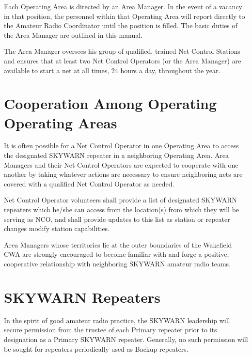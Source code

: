 \documentclass[pdflatex,letterpaper,twoside,12pt]{book}
\begin{document}
Each Operating Area is directed by an Area Manager.  In the event of a vacancy in that position, the personnel within that Operating Area will report directly to the Amateur Radio Coordinator until the position is filled.  The basic duties of the Area Manager are outlined in this manual. 

The Area Manager oversees his group of qualified, trained Net Control Stations and ensures that at least two Net Control Operators (or the Area Manager) are available to start a net at all times, 24 hours a day, throughout the year. 


\section{Cooperation Among Operating Operating Areas}

It is often possible for a Net Control Operator in one Operating Area to access the designated SKYWARN repeater in a neighboring Operating Area.  Area Managers and their Net Control Operators are expected to cooperate with one another by taking whatever actions are necessary to ensure neighboring nets are covered with a qualified Net Control Operator as needed. 

Net Control Operator volunteers shall provide a list of designated SKYWARN repeaters which he/she can access from the location(s) from which they will be serving as NCO, and shall provide updates to this list as station or repeater changes modify station capabilities. 

Area Managers whose territories lie at the outer boundaries of the Wakefield CWA are strongly encouraged to become familiar with and forge a positive, cooperative relationship with neighboring SKYWARN amateur radio teams.


\section{SKYWARN Repeaters}

In the spirit of good amateur radio practice, the SKYWARN leadership will secure permission from the trustee of each Primary repeater prior to its designation as a Primary SKYWARN repeater.  Generally, no such permission will be sought for repeaters periodically used as Backup repeaters. 
\end{document}
